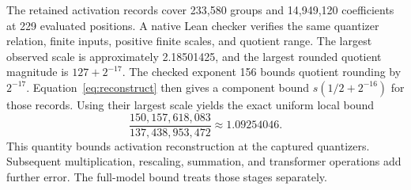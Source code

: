 The retained activation records cover 233,580 groups and 14,949,120 coefficients at 229 evaluated positions.  A native Lean checker verifies the same quantizer relation, finite inputs, positive finite scales, and quotient range.  The largest observed scale is approximately 2.18501425, and the largest rounded quotient magnitude is $127+2^{-17}$.  The checked exponent 156 bounds quotient rounding by $2^{-17}$.  Equation~\eqref{eq:reconstruct} then gives a component bound $s(1/2+2^{-16})$ for those records.  Using their largest scale yields the exact uniform local bound
\[
 \frac{150{,}157{,}618{,}083}{137{,}438{,}953{,}472}
 \approx1.09254046.
\]
This quantity bounds activation reconstruction at the captured quantizers.  Subsequent multiplication, rescaling, summation, and transformer operations add further error.  The full-model bound treats those stages separately.
